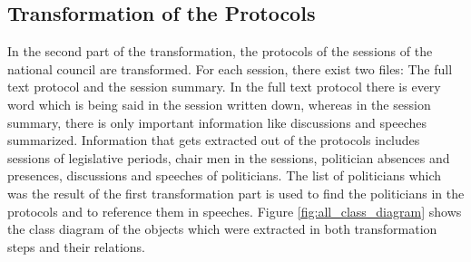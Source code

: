 

\subsection{Transformation of the Protocols}
In the second part of the transformation, the protocols of the sessions of the national council are transformed. For each session, there exist two files: The full text protocol and the session summary. In the full text protocol there is every word which is being said in the session written down, whereas in the session summary, there is only important information like discussions and speeches summarized. Information that gets extracted out of the protocols includes sessions of legislative periods, chair men in the sessions, politician absences and presences, discussions and speeches of politicians. The list of politicians which was the result of the first transformation part is used to find the politicians in the protocols and to reference them in speeches. %
Figure \ref{fig:all_class_diagram} shows the class diagram of the objects which were extracted in both transformation steps and their relations.


